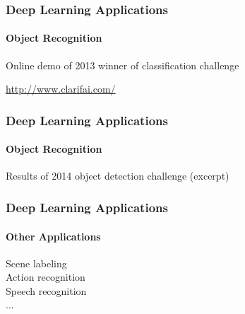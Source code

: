 \documentclass[xetex,professionalfont]{beamer}
\begin{document}

\begin{frame}
\frametitle{Deep Learning Applications}
\framesubtitle{Object Recognition}

\begin{center}
    Online demo of 2013 winner of classification challenge

    \bigskip
    \url{http://www.clarifai.com/}
\end{center}

\end{frame}


\begin{frame}[fragile]
\frametitle{Deep Learning Applications}
\framesubtitle{Object Recognition}

Results of 2014 object detection challenge (excerpt) %


\begin{center}
\end{center}

\end{frame}


\begin{frame}
\frametitle{Deep Learning Applications}
\framesubtitle{Other Applications}

Scene labeling\\\medskip
Action recognition\\\medskip
Speech recognition\\\medskip
...


\end{frame}
\end{document}
